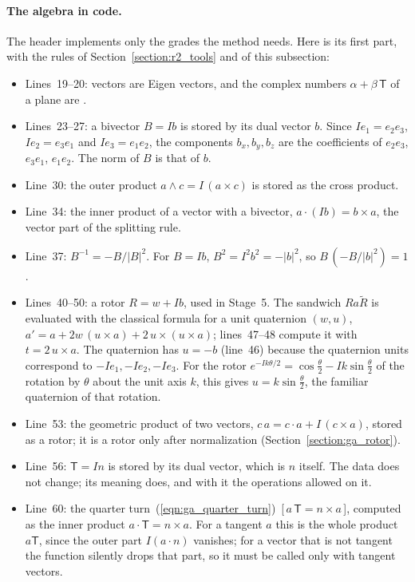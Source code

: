 \paragraph{The algebra in code.} The header  implements only the grades the method needs. Here is its first part, with the rules of Section~\ref{section:r2_tools} and of this subsection:

\begin{itemize}
\item Lines~19--20: vectors are Eigen vectors, and the complex numbers $\alpha + \beta\,\mathsf T$ of a plane are .
\item Lines~23--27: a bivector $B = I b$ is stored by its dual vector $b$. Since $I e_1 = e_2 e_3$, $I e_2 = e_3 e_1$ and $I e_3 = e_1 e_2$, the components $b_x, b_y, b_z$ are the coefficients of $e_2e_3$, $e_3e_1$, $e_1e_2$. The norm of $B$ is that of $b$.
\item Line~30: the outer product $a\wedge c = I\,(a\times c)$ is stored as the cross product.
\item Line~34: the inner product of a vector with a bivector, $a\cdot(Ib) = b\times a$, the vector part of the splitting rule.
\item Line~37: $B^{-1} = -B/|B|^2$. For $B = Ib$, $B^2 = I^2 b^2 = -|b|^2$, so $B\,(-B/|b|^2) = 1$.
\item Lines~40--50: a rotor $R = w + Ib$, used in Stage~5. The sandwich $R a \widetilde R$ is evaluated with the classical formula for a unit quaternion $(w, u)$, $a' = a + 2w\,(u\times a) + 2\,u\times(u\times a)$; lines~47--48 compute it with $t = 2\,u\times a$. The quaternion has $u = -b$ (line~46) because the quaternion units correspond to $-Ie_1, -Ie_2, -Ie_3$. For the rotor $e^{-Ik\theta/2} = \cos\frac\theta2 - Ik\sin\frac\theta2$ of the rotation by $\theta$ about the unit axis $k$, this gives $u = k\sin\frac\theta2$, the familiar quaternion of that rotation.
\item Line~53: the geometric product of two vectors, $c\,a = c\cdot a + I\,(c\times a)$, stored as a rotor; it is a rotor only after normalization (Section~\ref{section:ga_rotor}).
\item Line~56: $\mathsf T = In$ is stored by its dual vector, which is $n$ itself. The data does not change; its meaning does, and with it the operations allowed on it.
\item Line~60: the quarter turn~(\ref{eqn:ga_quarter_turn})~[\,$a\,\mathsf T = n\times a$\,], computed as the inner product $a\cdot\mathsf T = n\times a$. For a tangent $a$ this is the whole product $a\mathsf T$, since the outer part $I(a\cdot n)$ vanishes; for a vector that is not tangent the function silently drops that part, so it must be called only with tangent vectors.
\end{itemize}

